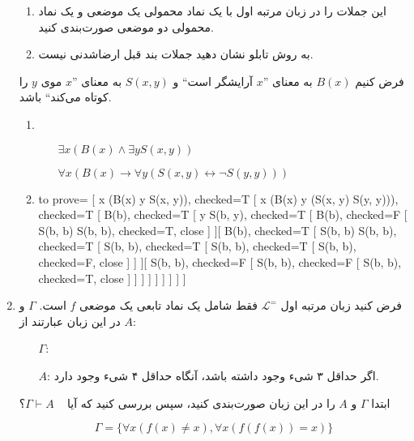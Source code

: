 \documentclass[12pt, 14paper]{article}
\begin{document}
\begin{enumerate}
\begin{enumerate}
  \item این جملات را در زبان مرتبه اول با یک نماد محمولی یک موضعی و یک نماد محمولی دو موضعی صورت‌بندی کنید.
  \item به روش تابلو نشان دهید جملات بند قبل ارضاشدنی نیست.
\end{enumerate}\quad
\begin{ans}
  فرض کنیم $B(x)$ به معنای ''$x$ آرایشگر است`` و $S(x, y)$ به معنای ''$x$ موی $y$ را کوتاه می‌کند`` باشد.
\begin{enumerate}
  \item \begin{enumerate}
    \item[] $\exists x (B(x) \wedge \exists y S(x, y))$
    \item[] $\forall x (B(x) \rightarrow \forall y (S(x, y) \leftrightarrow \neg S(y, y)))$
  \end{enumerate}
  \item \quad
  \begin{tableau}
    {
    to prove={}
    }
    [
      {\exists x (B(x) \wedge \exists y S(x, y))}, checked=T [
        {\forall x (B(x) \rightarrow \forall y (S(x, y) \leftrightarrow \neg S(y, y)))}, checked=T [
          B(b), checked=T [
            {\exists y S(b, y)}, checked=T [
              B(b), checked=F [
                {S(b, b) \leftrightarrow \neg S(b, b)}, checked=T, close
              ]
            ][
              B(b), checked=T [
                {S(b, b) \leftrightarrow \neg S(b, b)}, checked=T [
                  {S(b, b)}, checked=T [
                    {\neg S(b, b)}, checked=T [
                      {S(b, b)}, checked=F, close
                    ]
                  ]
                ][
                  {S(b, b)}, checked=F [
                    {\neg S(b, b)}, checked=F [
                      {S(b, b)}, checked=T, close
                    ]
                  ]
                ]
              ]
            ]
          ]
        ]
        ]
    ]
    \end{tableau}
\end{enumerate}             
\end{ans}
\item فرض کنید زبان مرتبه اول $\mathcal{L}^=$ فقط شامل یک نماد تابعی یک موضعی $f$ است. $\Gamma$ و $A$ در این زبان عبارتند از:
\begin{enumerate}
  \item[$\Gamma$:] 
  \item[$A$:] اگر حداقل ۳ شیء وجود داشته باشد، آنگاه حداقل ۴ شیء وجود دارد.
\end{enumerate}
ابتدا $\Gamma$ و $A$ را در این زبان صورت‌بندی کنید، سپس بررسی کنید که آیا ~ $\Gamma \vdash A$؟
\begin{ans}
    $$\Gamma = \{ \forall x (f(x) \neq x), \forall x (f(f(x)) = x) \}$$


\end{ans}
\end{enumerate}
\end{document}
